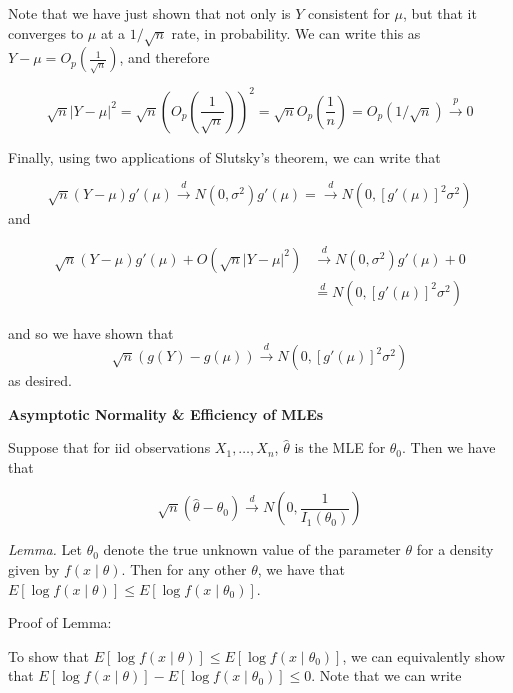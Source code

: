 \documentclass[
  letterpaper,
  DIV=11,
  numbers=noendperiod]{scrreprt}
\begin{document}
Note that we have just shown that not only is \(Y\) consistent for
\(\mu\), but that it converges to \(\mu\) at a \(1/\sqrt{n}\) rate, in
probability. We can write this as
\(Y - \mu = O_p\left(\frac{1}{\sqrt{n}}\right)\), and therefore

\[
\sqrt{n} | Y - \mu |^2 = \sqrt{n} \left( O_p\left( \frac{1}{\sqrt{n}}\right) \right)^2 = \sqrt{n} O_p\left( \frac{1}{n} \right) = O_p(1/\sqrt{n}) \overset{p}{\to} 0
\]

Finally, using two applications of Slutsky's theorem, we can write that

\[
\sqrt{n}(Y - \mu)g'(\mu) \overset{d}{\to} N(0, \sigma^2)g'(\mu) = \overset{d}{\to} N(0, [g'(\mu)]^2\sigma^2)
\] and

\begin{align*}
    \sqrt{n}(Y - \mu)g'(\mu) + O(\sqrt{n} |Y - \mu|^2) & \overset{d}{\to} N(0, \sigma^2)g'(\mu) + 0\\
    & \overset{d}{=} N(0, [g'(\mu)]^2\sigma^2) 
\end{align*}

and so we have shown that \[
\sqrt{n}\left( g(Y) - g(\mu) \right) \overset{d}{\to}  N(0, [g'(\mu)]^2\sigma^2)
\] as desired.

\textbf{Asymptotic Normality \& Efficiency of MLEs}

Suppose that for iid observations \(X_1, \dots, X_n\), \(\hat{\theta}\)
is the MLE for \(\theta_0\). Then we have that

\[
\sqrt{n} (\hat{\theta} - \theta_0) \overset{d}{\to} N\left(0, \frac{1}{I_1(\theta_0)}\right)
\]

\emph{Lemma.} Let \(\theta_0\) denote the true unknown value of the
parameter \(\theta\) for a density given by \(f(x \mid \theta)\). Then
for any other \(\theta\), we have that
\(E[\log f(x \mid \theta)] \leq E[\log f(x \mid \theta_0)]\).

Proof of Lemma:

To show that
\(E[\log f(x \mid \theta)] \leq E[\log f(x \mid \theta_0)]\), we can
equivalently show that
\(E[\log f(x \mid \theta)] - E[\log f(x \mid \theta_0)] \leq 0\). Note
that we can write
\end{document}
